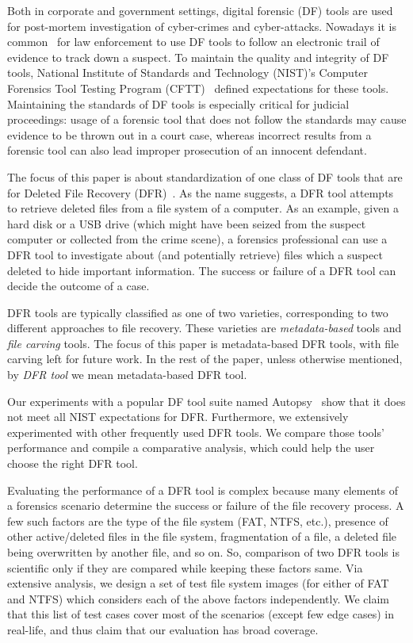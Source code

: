\documentclass{ws-rv9x6}
\newenvironment{paraphrase}{\color{blue}}{\color{black}} %
\begin{document}
\begin{paraphrase}
 Both in corporate and government settings, digital forensic (DF) tools are used for post-mortem investigation of cyber-crimes and cyber-attacks. 
Nowadays it is common~\cite{df:news} for law enforcement to use DF tools to follow an electronic trail of evidence to track down a suspect. 
To maintain the quality and integrity of DF tools, National Institute of Standards and Technology (NIST)'s 
Computer Forensics Tool Testing Program (CFTT)~\cite{cftt:nist} 
defined expectations for these tools. Maintaining the standards of DF tools 
is especially critical for judicial proceedings: usage of a forensic tool that does not follow the standards may cause evidence to be thrown 
out in a court case, whereas incorrect results from a forensic tool can also lead improper prosecution of an innocent defendant. 

The focus of this paper is about standardization of one class of DF 
tools that are for Deleted File Recovery (DFR)~\cite{meta:dfr:standards}. 
As the name suggests, a DFR tool attempts to retrieve deleted files
from a file system of a computer. As an example, given a hard disk or a USB drive 
(which might have been seized from the suspect computer or collected from the crime scene), a 
forensics professional can use a DFR tool to investigate about (and potentially retrieve) files which 
a suspect deleted to hide important information. 
The success or failure of a DFR tool can decide the outcome of a case.  

DFR tools are typically classified as one of two varieties, corresponding to two different approaches to file recovery.
These varieties are \emph{metadata-based} tools and \emph{file carving} tools.
The focus of this paper is metadata-based DFR tools, with file carving left for future work.
In the rest of the paper, unless otherwise mentioned, by \emph{DFR tool} we mean metadata-based DFR tool.

Our experiments with a popular DF tool suite named Autopsy~\cite{autopsy} 
show that it does not meet all NIST expectations for DFR. 
Furthermore, we extensively experimented with other frequently used DFR tools. 
We compare those tools' performance and compile a comparative analysis, which could help the user choose the right DFR tool. 

Evaluating the performance of a DFR tool is complex because many elements of a forensics scenario determine 
the success or failure of the file recovery process. 
A few such factors are the type of the file system (FAT, NTFS, etc.), presence of other active/deleted 
files in the file system, fragmentation of a file, a deleted file being overwritten by another file, and so on.
So, comparison of two DFR tools is scientific only if they are compared while keeping these factors same. 
Via extensive analysis, we design a set of test file system images (for either of FAT and NTFS) which considers each of the above factors independently. 
We claim that this list of test cases cover most of the scenarios (except few edge cases) in real-life, and thus claim that our evaluation has broad coverage. 


\end{paraphrase}
\end{document}
